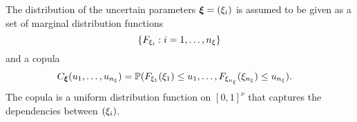 The distribution of the uncertain parameters $\bm{\xi} = (\xi_i)$ is assumed to be
given as a set of marginal distribution functions
\[
  \{ F_{\xi_i}: i = 1, \dots, {n_\xi} \}
\]
and a copula \cite{nelsen2006}
\begin{align*}
  C_{\bm{\xi}}(u_1, \dots, u_{n_\xi}) &= \mathbb{P}(F_{\xi_1}(\xi_1) \leq u_1, \dots, F_{\xi_{n_\xi}}(\xi_{n_\xi}) \leq u_{n_\xi}).
\end{align*}
The copula is a uniform distribution function on $[0, 1]^\nu$ that captures the
dependencies between $(\xi_i)$.
